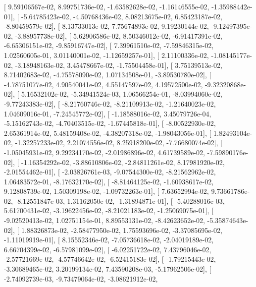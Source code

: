 \documentclass{article}
\begin{document}
       [  9.59106567e-02,   8.99751736e-02,  -1.63582628e-02,
         -1.16146555e-02,  -1.35988442e-01],
       [ -5.64785423e-02,  -4.50768436e-02,   8.08213675e-02,
          6.85423187e-02,  -8.80459579e-02],
       [  8.13733013e-02,   7.75674893e-02,   9.19230144e-02,
         -9.12497395e-02,  -3.88957738e-02],
       [  5.62906586e-02,   8.50346012e-02,  -6.91417391e-02,
         -6.65306151e-02,  -9.85916747e-02],
       [  7.39961510e-02,  -7.59846315e-02,   1.02560605e-01,
          3.01140001e-02,  -1.12659257e-01],
       [  2.11100336e-02,  -1.08145177e-02,  -3.18948163e-02,
          3.45478667e-02,  -1.75504458e-01],
       [  3.75139513e-02,   8.71402683e-02,  -4.75578090e-02,
          1.07134508e-01,  -3.89530780e-02],
       [ -4.78751077e-02,   4.90540041e-02,   4.55147597e-02,
          4.19572500e-02,  -9.32320868e-02],
       [  5.16532102e-02,  -5.34941524e-03,   1.06566254e-01,
         -8.03994060e-02,  -9.77243383e-02],
       [ -8.21760746e-02,  -8.21109913e-02,  -1.21640023e-02,
          1.04609016e-01,  -7.24545772e-02],
       [ -1.18588016e-02,   3.45079726e-04,  -5.15162743e-02,
         -4.70403515e-02,  -1.67445818e-01],
       [ -8.00522930e-02,   2.65361914e-02,   5.48159408e-02,
         -4.38207318e-02,  -1.98043056e-01],
       [  1.82493104e-02,  -1.32257233e-02,   2.21074556e-02,
          8.25918200e-02,  -7.76680074e-02],
       [ -1.05045931e-02,   9.29234170e-02,  -2.01986896e-02,
          4.61739589e-02,  -7.59890176e-02],
       [ -1.16354292e-02,  -3.88610806e-02,  -2.84811261e-02,
          8.17981920e-02,  -2.01554462e-01],
       [ -2.03826761e-03,  -9.07544300e-02,  -8.21562962e-02,
          1.06483572e-01,  -8.17632170e-02],
       [ -8.81464125e-02,  -1.60938617e-02,   9.12808739e-02,
          1.50309198e-02,  -1.09732263e-01],
       [  7.63652994e-02,   9.73661786e-02,  -8.12551847e-03,
          1.31162050e-02,  -1.31894871e-01],
       [ -5.40288016e-03,   5.61700431e-02,  -3.19622456e-02,
         -8.21021183e-02,  -1.25069075e-01],
       [ -9.02520413e-02,   1.02751154e-01,   8.89553131e-02,
         -8.42623652e-02,  -5.35874643e-02],
       [  1.88326873e-02,  -2.58477950e-02,   1.75593696e-02,
         -3.37085695e-02,  -1.11019919e-01],
       [  8.15552346e-02,  -7.05736618e-02,  -2.04019189e-02,
          6.66704399e-02,  -6.57981099e-02],
       [ -6.02251722e-02,   7.43796046e-02,  -2.57721669e-02,
         -4.57746642e-02,  -6.52415183e-02],
       [ -1.79215443e-02,  -3.30689465e-02,   3.20199134e-02,
          7.43590208e-03,  -5.17962506e-02],
       [ -2.74092739e-03,  -9.73479064e-02,  -3.08621912e-02,
\end{document}
